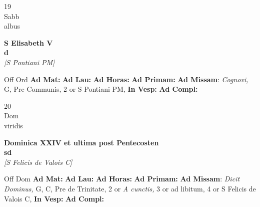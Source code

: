 \documentclass[10pt, openany]{book}
\begin{document}
    \begin{center}
        \begin{minipage}{3.5in}
            \vspace{2em}
            \begin{minipage}{0.5in}
                {\Huge 19} \\
                {\normalsize Sabb} \\
                {\normalsize albus}
            \end{minipage}
            \begin{minipage}{3.0in}
                \textbf{ \large S Elisabeth V \\
                \textnormal{\normalsize d}} \\ \textit{[S Pontiani PM]} \\ 
            \end{minipage}
            \begin{justify}Off Ord
                \textbf{Ad Mat: }
                \textbf{Ad Lau: }
                \textbf{Ad Horas: }
                \textbf{Ad Primam: }\textbf{Ad Missam}: \textit{Cognovi,} G, Pre Communis, 2 or S Pontiani PM,  
                \textbf{In Vesp: }
                \textbf{Ad Compl: }
            \end{justify}
        \end{minipage}
    \end{center}

    \begin{center}
        \begin{minipage}{3.5in}
            \vspace{2em}
            \begin{minipage}{0.5in}
                {\Huge 20} \\
                {\normalsize Dom} \\
                {\normalsize viridis}
            \end{minipage}
            \begin{minipage}{3.0in}
                \textbf{ \large Dominica XXIV et ultima post Pentecosten \\
                \textnormal{\normalsize sd}} \\ \textit{[S Felicis de Valois C]} \\ 
            \end{minipage}
            \begin{justify}Off Dom
                \textbf{Ad Mat: }
                \textbf{Ad Lau: }
                \textbf{Ad Horas: }
                \textbf{Ad Primam: }\textbf{Ad Missam}: \textit{Dicit Dominus,} G, C, Pre de Trinitate, 2 or \textit{A cunctis,} 3 or ad libitum, 4 or S Felicis de Valois C,  
                \textbf{In Vesp: }
                \textbf{Ad Compl: }
            \end{justify}
        \end{minipage}
    \end{center}
\end{document}
